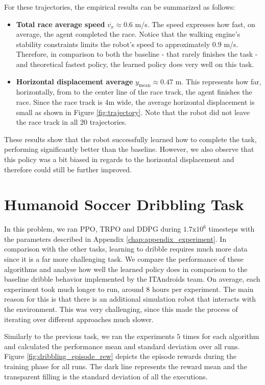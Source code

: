 For these trajectories, the empirical results can be summarized as follows: 

\begin{itemize}
	\item \textbf{Total race average speed} $\overline{v_x} \approx 0.6$ m/s. The speed expresses how fast, on average,
	the agent completed the race. Notice that the walking engine's stability constraints limits the robot's
	speed to approximately $0.9$ m/s. Therefore, in comparison to both the baseline - that rarely finishes the task - and
	theoretical fastest policy, the learned policy does very well on this task.
	\item \textbf{Horizontal displacement average} $y_{\text{mean}} \approx 0.47$ m. This represents how far,
	horizontally, from to the center line of the race track, the agent finishes the race. Since the race track
	is 4m wide, the average horizontal displacement is small as shown in Figure \ref{fig:trajectory}.
	Note that the robot did not leave the race track in all $20$ trajectories.
\end{itemize}

These results show that the robot successfully learned how to complete the task, performing significantly better
than the baseline.
However, we also observe that this policy was a bit biased in regards to the horizontal displacement
and therefore could still be further improved.

\section{Humanoid Soccer Dribbling Task}

In this problem, we ran PPO, TRPO and DDPG during $1.7\text{x} 10^6$ timesteps with the parameters described in Appendix
\ref{chap:appendix_experiment}. In comparison with the other tasks, learning to dribble
requires much more data since it is a far more challenging task.
We compare the performance of these algorithms and analyse how well the learned policy does in comparison to
the baseline dribble behavior implemented by the ITAndroids team.
On average, each experiment took much longer to run, around $8$ hours per experiment.
The main reason for this is that there is an additional simulation robot that
interacts with the environment. 
This was very challenging, since this made the process of iterating over different approaches much slower.

Similarly to the previous task, 
we ran the experiments $5$ times for each algorithm and calculated the performance mean and standard deviation over all runs.
Figure \ref{fig:dribbling_episode_rew} depicts the episode rewards during the training phase for all runs. 
The dark line represents the reward mean and the transparent filling is the standard deviation
of all the executions.

